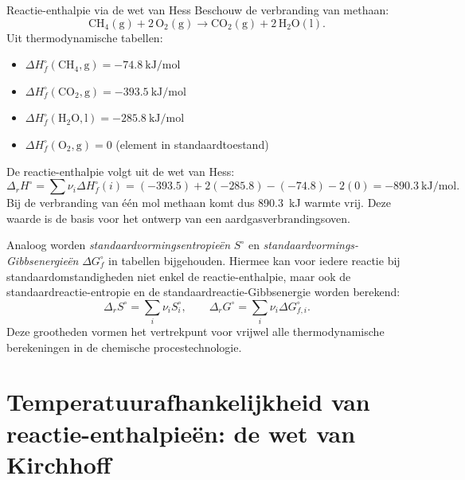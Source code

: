 \begin{voorbeeld}{Reactie-enthalpie via de wet van Hess}
Beschouw de verbranding van methaan:
\[
\mathrm{CH_4(g) + 2\,O_2(g) \rightarrow CO_2(g) + 2\,H_2O(l)}.
\]
Uit thermodynamische tabellen:
\begin{itemize}
\item $\Delta H_f^\circ(\mathrm{CH_4,g}) = \SI{-74.8}{\kilo\joule\per\mole}$
\item $\Delta H_f^\circ(\mathrm{CO_2,g}) = \SI{-393.5}{\kilo\joule\per\mole}$
\item $\Delta H_f^\circ(\mathrm{H_2O,l}) = \SI{-285.8}{\kilo\joule\per\mole}$
\item $\Delta H_f^\circ(\mathrm{O_2,g}) = 0$ (element in standaardtoestand)
\end{itemize}
De reactie-enthalpie volgt uit de wet van Hess:
\[
\Delta_r H^\circ = \sum \nu_i \Delta H_f^\circ(i) = (-393.5) + 2(-285.8) - (-74.8) - 2(0) = \SI{-890.3}{\kilo\joule\per\mole}.
\]
Bij de verbranding van \'e\'en mol methaan komt dus \SI{890.3}{\kilo\joule} warmte vrij. Deze waarde is de basis voor het ontwerp van een aardgasverbrandingsoven.
\end{voorbeeld}

Analoog worden \emph{standaardvormingsentropie\"en} $S^\circ$ en \emph{standaardvormings-Gibbsenergie\"en} $\Delta G_f^\circ$ in tabellen bijgehouden. Hiermee kan voor iedere reactie bij standaardomstandigheden niet enkel de reactie-enthalpie, maar ook de standaardreactie-entropie en de standaardreactie-Gibbsenergie worden berekend:
\begin{equation}
\Delta_r S^\circ = \sum_i \nu_i S_i^\circ, \qquad \Delta_r G^\circ = \sum_i \nu_i \Delta G_{f,i}^\circ.
\end{equation}
Deze grootheden vormen het vertrekpunt voor vrijwel alle thermodynamische berekeningen in de chemische procestechnologie.

\section{Temperatuurafhankelijkheid van reactie-enthalpie\"en: de wet van Kirchhoff}

